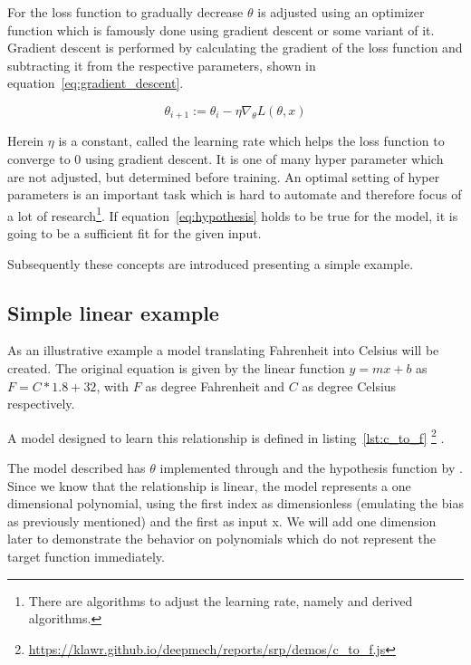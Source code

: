 For the loss function to gradually decrease $\theta$ is adjusted using an optimizer function which is famously done using gradient descent or some variant of it.
Gradient descent is performed by calculating the gradient of the loss function and subtracting it from the respective parameters, shown in equation~\eqref{eq:gradient_descent}.

\begin{equation}
    \theta_{i+1} := \theta_i - \eta \nabla_\theta L(\theta, x)
    \label{eq:gradient_descent}
\end{equation}

Herein $\eta$ is a constant, called the learning rate which helps the loss function to converge to 0 using gradient descent.
It is one of many hyper parameter which are not adjusted, but determined before training. An optimal setting of hyper parameters is an important task which is hard to automate and therefore focus of a lot of research\footnote{There are algorithms to adjust the learning rate, namely  \cite{Duchi2010} and derived algorithms.}.
If equation~\eqref{eq:hypothesis} holds to be true for the model, it is going to be a sufficient fit for the given input.

Subsequently these concepts are introduced presenting a simple example.

\subsection{Simple linear example} \label{ch:simple_linear_example}

As an illustrative example a model translating Fahrenheit into Celsius will be created.
The original equation is given by the linear function $y = mx + b$ as $F = C * 1.8 + 32$, with $F$ as degree Fahrenheit and $C$ as degree Celsius respectively.

A model designed to learn this relationship is defined in listing~\ref{lst:c_to_f} \footnote{\url{https://klawr.github.io/deepmech/reports/srp/demos/c\_to\_f.js}} .



The model described has $\theta$ implemented through  and the hypothesis function by .
Since we know that the relationship is linear, the model represents a one dimensional polynomial, using the first index as dimensionless (emulating the bias as previously mentioned) and the first as input x.
We will add one dimension later to demonstrate the behavior on polynomials which do not represent the target function immediately.

